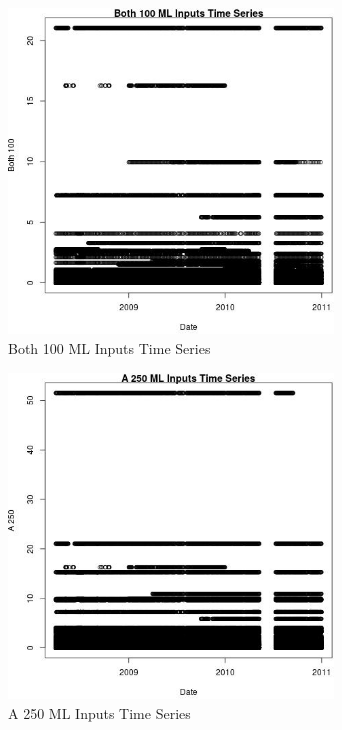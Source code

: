 \begin{figure} 
\centering  
\includegraphics[width=0.77\textwidth]{Code_Outputs/ML_input_report_ML_input_PM25_Step5_part_d_de_duplicated_aves_ML_input_Both_100vDate.jpg} 
\caption{\label{fig:ML_input_report_ML_input_PM25_Step5_part_d_de_duplicated_aves_ML_inputBoth_100vDate}Both 100 ML Inputs Time Series} 
\end{figure} 
 

\begin{figure} 
\centering  
\includegraphics[width=0.77\textwidth]{Code_Outputs/ML_input_report_ML_input_PM25_Step5_part_d_de_duplicated_aves_ML_input_A_250vDate.jpg} 
\caption{\label{fig:ML_input_report_ML_input_PM25_Step5_part_d_de_duplicated_aves_ML_inputA_250vDate}A 250 ML Inputs Time Series} 
\end{figure} 
 

